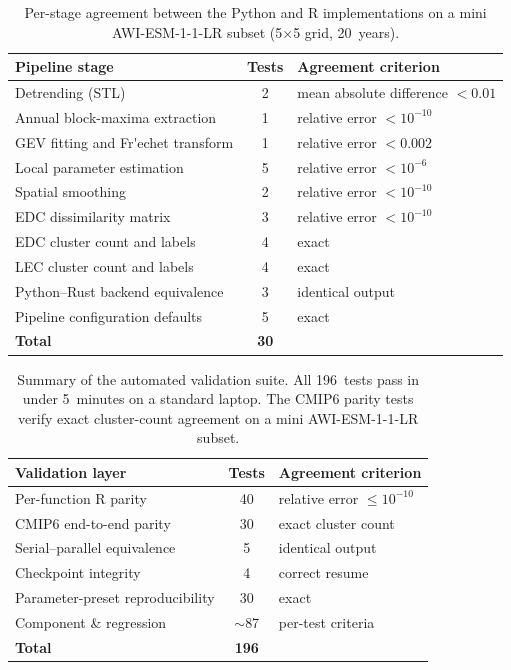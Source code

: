 \documentclass[preprint,12pt,a4paper]{elsarticle}
\begin{document}
{\begin{table}[!htbp]
\centering
\small
\setlength{\tabcolsep}{5pt}
\begin{tabularx}{\textwidth}{>{\raggedright\arraybackslash}p{4.2cm}c>{\raggedright\arraybackslash}X}
\toprule
\textbf{Pipeline stage} & \textbf{Tests} &
  \textbf{Agreement criterion} \\
\midrule
Detrending (STL) & 2 &
  mean absolute difference $< 0.01$ \\
Annual block-maxima extraction & 1 &
  relative error $< 10^{-10}$ \\
GEV fitting and Fr\'{}echet transform & 1 &
  relative error $< 0.002$ \\
Local parameter estimation & 5 &
  relative error $< 10^{-6}$ \\
Spatial smoothing & 2 &
  relative error $< 10^{-10}$ \\
EDC dissimilarity matrix & 3 &
  relative error $< 10^{-10}$ \\
EDC cluster count and labels & 4 &
  exact \\
LEC cluster count and labels & 4 &
  exact \\
Python--Rust backend equivalence & 3 &
  identical output \\
Pipeline configuration defaults & 5 &
  exact \\
\midrule
\textbf{Total} & \textbf{30} & \\
\bottomrule
\end{tabularx}
\caption{Per-stage agreement between the Python and R
  implementations on a mini AWI-ESM-1-1-LR subset
  (5$\times$5 grid, 20~years).}
\label{tab:pipeline-parity}
\end{table}

\begin{table}[!htbp]
\centering
\small
\setlength{\tabcolsep}{5pt}
\begin{tabularx}{\textwidth}{>{\raggedright\arraybackslash}p{4.3cm}c>{\raggedright\arraybackslash}X}
\toprule
\textbf{Validation layer} & \textbf{Tests} &
  \textbf{Agreement criterion} \\
\midrule
Per-function R parity &
  40 & relative error $\leq 10^{-10}$ \\
CMIP6 end-to-end parity &
  30 & exact cluster count \\
Serial--parallel equivalence &
  5 & identical output \\
Checkpoint integrity &
  4 & correct resume \\
Parameter-preset reproducibility &
  30 & exact \\
Component \& regression &
  $\sim$87 & per-test criteria \\
\midrule
\textbf{Total} & \textbf{196} & \\
\bottomrule
\end{tabularx}
\caption{Summary of the automated validation suite.
  All 196~tests pass in under 5~minutes on a standard laptop.
  The CMIP6 parity tests verify exact cluster-count agreement
  on a mini AWI-ESM-1-1-LR subset.}
\label{tab:validation}
\end{table}}
\end{document}
